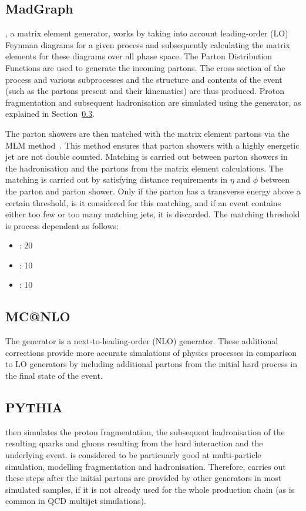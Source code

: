 \subsection{MadGraph}
\label{ss:madgraph}
\MADGRAPH \cite{madgraph5}, a matrix element generator, works by taking into account leading-order (LO)
Feynman diagrams for a given process and subsequently calculating the matrix elements for these diagrams over
all phase space. The Parton Distribution Functions are used to generate the incoming partons.
The cross section of the process and various subprocesses and the structure and contents of the event (such as
the partons present and their kinematics) are thus produced. Proton fragmentation and subsequent hadronisation
are simulated using the \PYTHIA generator, as explained in Section~\ref{ss:pythia}.

The parton showers are then matched with the matrix element partons via the MLM method~\cite{mlm}. This
method ensures that parton showers with a highly energetic jet are not double counted. Matching is carried out
between parton showers in the hadronisation and the partons from the matrix element calculations. The matching
is carried out by satisfying distance requirements in $\eta$ and $\phi$ between the parton and parton shower.
Only if the parton has a transverse energy above a certain threshold, is it considered for this matching, and
if an event contains either too few or too many matching jets, it is discarded. The matching threshold is
process dependent as follows:

\begin{itemize}
  \item \ttbar: 20\GeV
  \item \WpJets: 10\GeV
  \item \ZpJets: 10\GeV
\end{itemize}

\subsection{MC@NLO}
\label{ss:mcatnlo}
The \MCATNLO \cite{mcatnlo_Frixione1, mcatnlo_Frixione2} generator is a next-to-leading-order (NLO) generator.
These additional corrections provide more accurate simulations of physics processes in comparison to LO
generators by including additional partons from the initial hard process in the final state of the event.

\subsection{PYTHIA}
\label{ss:pythia}
\PYTHIA \cite{pythia8} then simulates the proton fragmentation, the subsequent hadronisation of the resulting
quarks and gluons resulting from the hard interaction and the underlying event. \PYTHIA is considered to be
particuarly good at multi-particle simulation, modelling fragmentation and hadronisation. Therefore, \PYTHIA
carries out these steps after the initial partons are provided by other generators in most simulated samples,
if it is not already used for the whole production chain (as is common in QCD multijet simulations).

